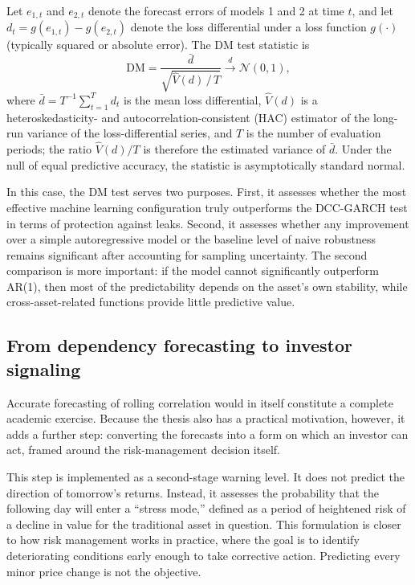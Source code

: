 Let $e_{1,t}$ and $e_{2,t}$ denote the forecast errors of models 1 and 2 at time $t$, and let $d_t = g(e_{1,t}) - g(e_{2,t})$ denote the loss differential under a loss function $g(\cdot)$ (typically squared or absolute error). The DM test statistic is
\begin{equation}
    \mathrm{DM} = \frac{\bar{d}}{\sqrt{\hat{V}(d)\,/\, T}} \xrightarrow{d} \mathcal{N}(0,1),
\end{equation}
where $\bar{d} = T^{-1}\sum_{t=1}^{T} d_t$ is the mean loss differential, $\hat{V}(d)$ is a heteroskedasticity- and autocorrelation-consistent (HAC) estimator of the long-run variance of the loss-differential series, and $T$ is the number of evaluation periods; the ratio $\hat{V}(d)/T$ is therefore the estimated variance of $\bar{d}$. Under the null of equal predictive accuracy, the statistic is asymptotically standard normal.

In this case, the DM test serves two purposes. First, it assesses whether the most effective machine learning configuration truly outperforms the DCC-GARCH test in terms of protection against leaks. Second, it assesses whether any improvement over a simple autoregressive model or the baseline level of naive robustness remains significant after accounting for sampling uncertainty. The second comparison is more important: if the model cannot significantly outperform AR(1), then most of the predictability depends on the asset's own stability, while cross-asset-related functions provide little predictive value.

\subsection{From dependency forecasting to investor signaling}

Accurate forecasting of rolling correlation would in itself constitute a complete academic exercise. Because the thesis also has a practical motivation, however, it adds a further step: converting the forecasts into a form on which an investor can act, framed around the risk-management decision itself.

This step is implemented as a second-stage warning level. It does not predict the direction of tomorrow's returns. Instead, it assesses the probability that the following day will enter a ``stress mode,'' defined as a period of heightened risk of a decline in value for the traditional asset in question. This formulation is closer to how risk management works in practice, where the goal is to identify deteriorating conditions early enough to take corrective action. Predicting every minor price change is not the objective.

